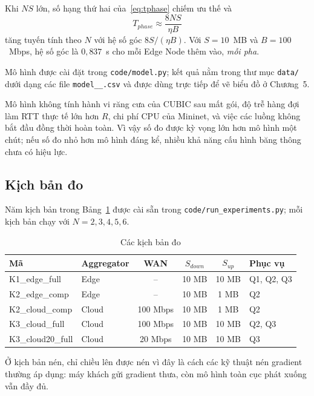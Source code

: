 Khi $N S$ lớn, số hạng thứ hai của~\eqref{eq:tphase} chiếm ưu thế và
\begin{equation}
    T_{phase} \approx \frac{8 N S}{\eta B}
    \label{eq:linear}
\end{equation}
tăng tuyến tính theo $N$ với hệ số góc $8S/(\eta B)$. Với $S = 10$~MB và $B = 100$~Mbps, hệ số góc là $0{,}837$~s cho mỗi Edge Node thêm vào, \emph{mỗi pha}.

Mô hình được cài đặt trong \texttt{code/model.py}; kết quả nằm trong thư mục \texttt{data/} dưới dạng các file \texttt{model\_<vị trí>\_<kích thước>.csv} và được dùng trực tiếp để vẽ biểu đồ ở Chương~5.

Mô hình không tính hành vi răng cưa của CUBIC sau mất gói, độ trễ hàng đợi làm RTT thực tế lớn hơn $R$, chi phí CPU của Mininet, và việc các luồng không bắt đầu đồng thời hoàn toàn. Vì vậy số đo được kỳ vọng lớn hơn mô hình một chút; nếu số đo nhỏ hơn mô hình đáng kể, nhiều khả năng cấu hình băng thông chưa có hiệu lực.

\subsection{Kịch bản đo}
Năm kịch bản trong Bảng~\ref{tab:scen} được cài sẵn trong \texttt{code/run\_experiments.py}; mỗi kịch bản chạy với $N = 2, 3, 4, 5, 6$.

\begin{table}[H]
    \centering
    \caption{Các kịch bản đo}
    \label{tab:scen}
    \begin{tabular}{l l c c c l}
        \toprule
        \textbf{Mã} & \textbf{Aggregator} & \textbf{WAN} & $S_{down}$ & $S_{up}$ & \textbf{Phục vụ} \\
        \midrule
        K1\_edge\_full & Edge & -- & 10 MB & 10 MB & Q1, Q2, Q3 \\
        K2\_edge\_comp & Edge & -- & 10 MB & 1 MB & Q2 \\
        K2\_cloud\_comp & Cloud & 100 Mbps & 10 MB & 1 MB & Q2 \\
        K3\_cloud\_full & Cloud & 100 Mbps & 10 MB & 10 MB & Q2, Q3 \\
        K3\_cloud20\_full & Cloud & 20 Mbps & 10 MB & 10 MB & Q3 \\
        \bottomrule
    \end{tabular}
\end{table}

Ở kịch bản nén, chỉ chiều lên được nén vì đây là cách các kỹ thuật nén gradient thường áp dụng: máy khách gửi gradient thưa, còn mô hình toàn cục phát xuống vẫn đầy đủ.

